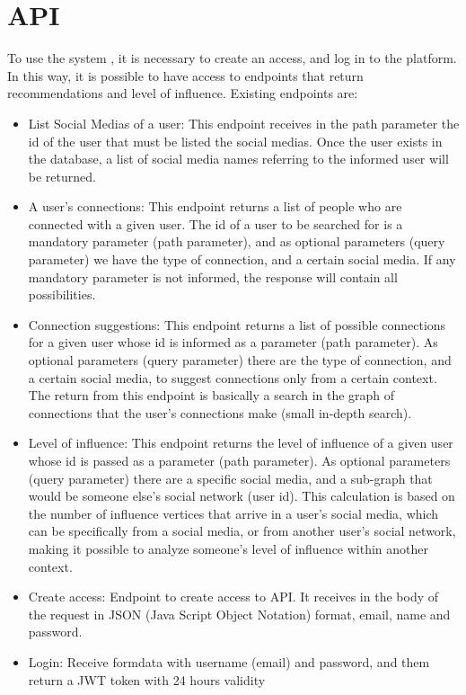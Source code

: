 \section{API}
To use the system \cite{MetaSocialMediaAPI}, it is necessary to create an access, and log in to the platform. In this way, it is possible to have access to endpoints that return recommendations and level of influence. Existing endpoints are:
\begin{itemize}
    \item List Social Medias of a user: This endpoint receives in the path parameter the id of the user that must be listed the social medias. Once the user exists in the database, a list of social media names referring to the informed user will be returned.
    \item A user's connections: This endpoint returns a list of people who are connected with a given user. The id of a user to be searched for is a mandatory parameter (path parameter), and as optional parameters (query parameter) we have the type of connection, and a certain social media. If any mandatory parameter is not informed, the response will contain all possibilities.
    \item Connection suggestions: This endpoint returns a list of possible connections for a given user whose id is informed as a parameter (path parameter). As optional parameters (query parameter) there are the type of connection, and a certain social media, to suggest connections only from a certain context. The return from this endpoint is basically a search in the graph of connections that the user's connections make (small in-depth search).
    \item Level of influence: This endpoint returns the level of influence of a given user whose id is passed as a parameter (path parameter). As optional parameters (query parameter) there are a specific social media, and a sub-graph that would be someone else's social network (user id). This calculation is based on the number of influence vertices that arrive in a user's social media, which can be specifically from a social media, or from another user's social network, making it possible to analyze someone's level of influence within another context.
    \item Create access: Endpoint to create access to API. It receives in the body of the request in JSON (Java Script Object Notation) format, email, name and password.
    \item Login: Receive formdata with username (email) and password, and them return a JWT token with 24 hours validity
\end{itemize}





